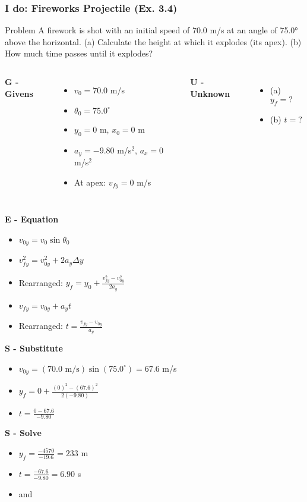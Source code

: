 \documentclass{beamer}
\begin{document}
\begin{frame}[fragile]
\frametitle{I do: Fireworks Projectile (Ex. 3.4)}
\begin{block}{Problem}
A firework is shot with an initial speed of 70.0 m/s at an angle of 75.0° above the horizontal. (a) Calculate the height at which it explodes (its apex). (b) How much time passes until it explodes?
\end{block}

\begin{columns}[T]
\textbf{G - Givens}
\begin{itemize}
\item $v_0 = 70.0$ m/s
\item $\theta_0 = 75.0^\circ$
\item $y_0 = 0$ m, $x_0 = 0$ m
\item $a_y = -9.80$ m/s$^2$, $a_x = 0$ m/s$^2$
\item At apex: $v_{fy} = 0$ m/s
\end{itemize}

\textbf{U - Unknown}
\begin{itemize}
\item (a) $y_f = ?$
\item (b) $t = ?$
\end{itemize}
\end{columns}

\textbf{E - Equation}
\begin{itemize}
\item $v_{0y} = v_0 \sin\theta_0$
\item $v_{fy}^2 = v_{0y}^2 + 2a_y\Delta y$
\item Rearranged: $y_f = y_0 + \frac{v_{fy}^2 - v_{0y}^2}{2a_y}$
\item $v_{fy} = v_{0y} + a_y t$
\item Rearranged: $t = \frac{v_{fy} - v_{0y}}{a_y}$
\end{itemize}

\textbf{S - Substitute}
\begin{itemize}
\item $v_{0y} = (70.0 \text{ m/s})\sin(75.0^\circ) = 67.6$ m/s
\item $y_f = 0 + \frac{(0)^2 - (67.6)^2}{2(-9.80)}$
\item $t = \frac{0 - 67.6}{-9.80}$
\end{itemize}

\textbf{S - Solve}
\begin{itemize}
\item $y_f = \frac{-4570}{-19.6} = 233$ m
\item $t = \frac{-67.6}{-9.80} = 6.90$ s
\item {} and 
\end{itemize}
\end{frame}
\end{document}
